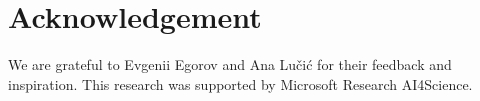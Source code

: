 \section*{Acknowledgement}
We are grateful to Evgenii Egorov and Ana Lučić for their feedback and inspiration. This research was supported by Microsoft Research
AI4Science. 
